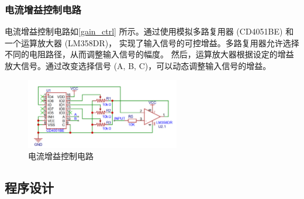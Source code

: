 \documentclass[a4paper,12pt,UTF8]{article}
\begin{document}
\subsubsection{电流增益控制电路}
电流增益控制电路如\autoref{gain_ctrl} 所示。通过使用模拟多路复用器 (CD4051BE) 和一个运算放大器 (LM358DR)，
实现了输入信号的可控增益。多路复用器允许选择不同的电阻路径，从而调整输入信号的幅度。
然后，运算放大器根据设定的增益放大信号。通过改变选择信号 (A, B, C)，可以动态调整输入信号的增益。
\begin{figure}[H]
    \centering
    \includegraphics[width=0.6\textwidth]{figures/gain_ctrl.png}
    \caption{电流增益控制电路}
    \label{gain_ctrl}
\end{figure}

\subsection{程序设计}
\end{document}
